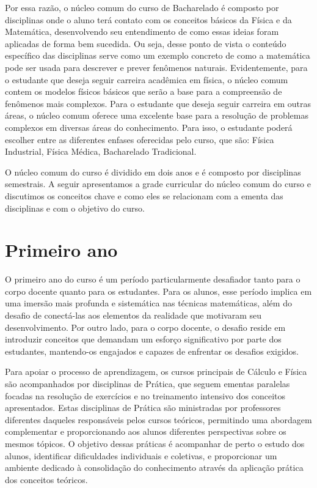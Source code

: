 \documentclass[a4paper, 12pt]{article}
\newcounter{mat}
\begin{document}
Por essa razão, o núcleo comum do curso de Bacharelado é composto por disciplinas onde
o aluno terá contato com os conceitos básicos da Física e da Matemática, desenvolvendo
seu entendimento de como essas ideias foram aplicadas de forma bem sucedida. Ou seja,
desse ponto de vista o conteúdo específico das disciplinas serve como um exemplo
concreto de como a matemática pode ser usada para descrever e prever fenômenos
naturais. Evidentemente, para o estudante que deseja seguir carreira acadêmica em
física, o núcleo comum contem os modelos físicos básicos que serão a base para a
compreensão de fenômenos mais complexos. Para o estudante que deseja seguir carreira em
outras áreas, o núcleo comum oferece uma excelente base para a resolução de problemas
complexos em diversas áreas do conhecimento. Para isso, o estudante poderá escolher
entre as diferentes enfases oferecidas pelo curso, que são: Física Industrial, Física
Médica, Bacharelado Tradicional.

O núcleo comum do curso é dividido em dois anos e é composto por disciplinas
semestrais. A seguir apresentamos a grade curricular do núcleo comum do curso e
discutimos os conceitos chave e como eles se relacionam com a ementa das disciplinas e
com o objetivo do curso.

\section{Primeiro ano}

O primeiro ano do curso é um período particularmente desafiador tanto para o corpo
docente quanto para os estudantes. Para os alunos, esse período implica em uma imersão
mais profunda e sistemática nas técnicas matemáticas, além do desafio de conectá-las
aos elementos da realidade que motivaram seu desenvolvimento. Por outro lado, para o
corpo docente, o desafio reside em introduzir conceitos que demandam um esforço
significativo por parte dos estudantes, mantendo-os engajados e capazes de enfrentar os
desafios exigidos.

Para apoiar o processo de aprendizagem, os cursos principais de Cálculo e Física são
acompanhados por disciplinas de Prática, que seguem ementas paralelas focadas na
resolução de exercícios e no treinamento intensivo dos conceitos apresentados. Estas
disciplinas de Prática são ministradas por professores diferentes daqueles responsáveis
pelos cursos teóricos, permitindo uma abordagem complementar e proporcionando aos
alunos diferentes perspectivas sobre os mesmos tópicos. O objetivo dessas práticas é
acompanhar de perto o estudo dos alunos, identificar dificuldades individuais e
coletivas, e proporcionar um ambiente dedicado à consolidação do conhecimento através
da aplicação prática dos conceitos teóricos.
\end{document}
